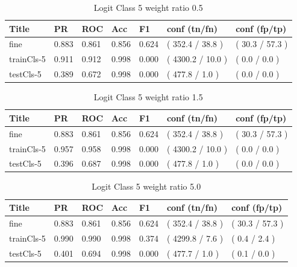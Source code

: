 \documentclass[ms]{nuthesis}
\begin{document}
\FloatBarrier
\begin{table}[H]
\centering
\caption{Logit Class 5 weight ratio 0.5}
\label{tab:LogRegCls5-Wtp5}
\begin{tabular}{|l||l||l||l||l||l||l|}\toprule
Title & PR & ROC & Acc & F1 & conf (tn/fn) & conf (fp/tp) \\ \midrule
fine & 0.883 & 0.861 & 0.856 & 0.624 & ( 352.4 / 38.8 ) & ( 30.3 / 57.3 ) \\
trainCls-5 & 0.911 & 0.912 & 0.998 & 0.000 & ( 4300.2 / 10.0 ) & ( 0.0 / 0.0 ) \\
testCls-5 & 0.389 & 0.672 & 0.998 & 0.000 & ( 477.8 / 1.0 ) & ( 0.0 / 0.0 ) \\ \bottomrule
\end{tabular}
\end{table}
\FloatBarrier


\FloatBarrier
\begin{table}[H]
\centering
\caption{Logit Class 5 weight ratio 1.5}
\label{tab:LogRegCls5-Wt1p5}
\begin{tabular}{|l||l||l||l||l||l||l|}\toprule
Title & PR & ROC & Acc & F1 & conf (tn/fn) & conf (fp/tp) \\ \midrule
fine & 0.883 & 0.861 & 0.856 & 0.624 & ( 352.4 / 38.8 ) & ( 30.3 / 57.3 ) \\
trainCls-5 & 0.957 & 0.958 & 0.998 & 0.000 & ( 4300.2 / 10.0 ) & ( 0.0 / 0.0 ) \\
testCls-5 & 0.396 & 0.687 & 0.998 & 0.000 & ( 477.8 / 1.0 ) & ( 0.0 / 0.0 ) \\ \bottomrule
\end{tabular}
\end{table}
\FloatBarrier

\FloatBarrier
\begin{table}[H]
\centering
\caption{Logit Class 5 weight ratio 5.0}
\label{tab:LogRegCls5-Wt5}
\begin{tabular}{|l||l||l||l||l||l||l|}\toprule
Title & PR & ROC & Acc & F1 & conf (tn/fn) & conf (fp/tp) \\ \midrule
fine & 0.883 & 0.861 & 0.856 & 0.624 & ( 352.4 / 38.8 ) & ( 30.3 / 57.3 ) \\
trainCls-5 & 0.990 & 0.990 & 0.998 & 0.374 & ( 4299.8 / 7.6 ) & ( 0.4 / 2.4 ) \\
testCls-5 & 0.401 & 0.694 & 0.998 & 0.000 & ( 477.7 / 1.0 ) & ( 0.1 / 0.0 ) \\ \bottomrule
\end{tabular}
\end{table}
\FloatBarrier
\end{document}
